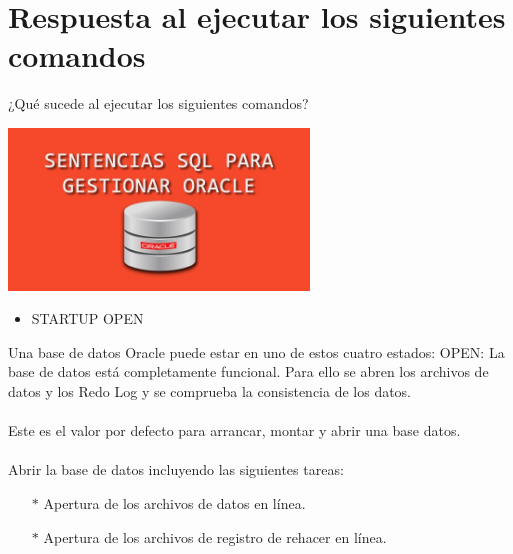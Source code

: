 \section{Respuesta al ejecutar los siguientes comandos} 
\vspace{\baselineskip}
¿Qué sucede al ejecutar los siguientes comandos?
\begin{center}
	\includegraphics[width=8cm]{./Imagenes/1} 
\end{center}

\begin{itemize}
	\item STARTUP OPEN
\end{itemize}
\begin{adjustwidth}{0.40in}{0.0in}
	Una base de datos Oracle puede estar en uno de estos cuatro estados:
	OPEN: La base de datos está completamente funcional. Para ello se abren los archivos de datos y los Redo Log y se comprueba la consistencia de los datos.\\ \\
	Este es el valor por defecto para arrancar, montar y abrir una base datos.\\ \\
	Abrir la base de datos incluyendo las siguientes tareas:	
	\begin{itemize}
		\item[$*$] Apertura de los archivos de datos en línea.
		\item[$*$] Apertura de los archivos de registro de rehacer en línea.\\
\\
	\end{itemize}		
\end{adjustwidth}

